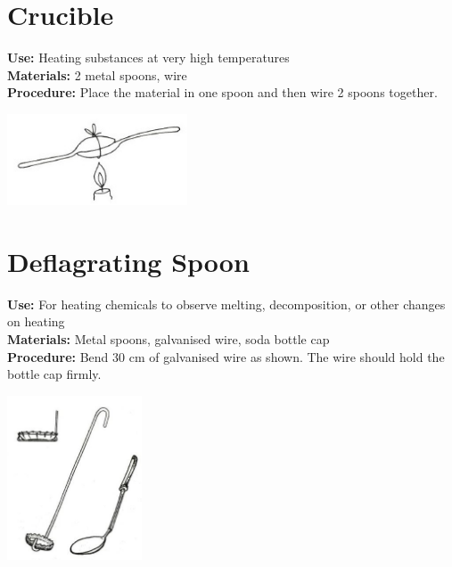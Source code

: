 \begin{multicols}{2}
\section{Crucible}
\label{sec:crucible}
\vspace{-10pt}
\textbf{Use:} Heating substances at very high temperatures\\
\textbf{Materials:} 2 metal spoons, wire\\
\textbf{Procedure:} Place the material in one spoon and then wire 2 spoons together.
\begin{center}
\includegraphics[width=0.4\textwidth]{./img/vso/crucible.jpg}
\end{center}

\section{Deflagrating Spoon}
\label{sec:deflagratingspoon}
\vspace{-10pt}
\textbf{Use:} For heating chemicals to observe melting, decomposition, or other changes on heating\\
\textbf{Materials:} Metal spoons, galvanised wire, soda bottle cap\\
\textbf{Procedure:} Bend 30 cm of galvanised wire as shown. The wire should hold the bottle cap firmly.
\begin{center}
\includegraphics[width=0.3\textwidth]{./img/source/deflagrating-spoon.jpg}
\end{center}

\columnbreak


\end{multicols}
